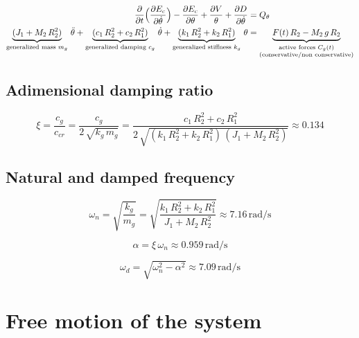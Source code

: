 \documentclass[a4paper,12pt,oneside]{article}
\begin{document}
\begin{align}
\label{eqn:motion}
	\frac{\partial}{\partial t} %
		\Bigl(\frac{\partial E_c}{\partial \dot{\theta}}\Bigr) - %
		\frac{\partial E_c}{\partial \theta} + %
		\frac{\partial V}{\theta} + %
		\frac{\partial D}{\partial \dot{\theta}} & = Q_\theta \notag \\
	\underbrace{(J_1 + M_2 \, R_2^2)}_ %
		{\text{generalized mass $ m_g $}} \, \ddot{\theta} + %
		\underbrace{(c_1 \, R_2^2 + c_2 \, R_1^2)}_ %
		{\text{generalized damping $ c_g $}} \, \dot{\theta} + %
		\underbrace{(k_1 \, R_2^2 + k_2 \, R_1^2)}_ %
		{\text{generalized stiffness $  k_g $}} \, \theta & = %
		\underbrace{F(t) \, R_2 - M_2 \, g \, R_2}_ %
		{\substack{\text{active forces $ C_g(t) $} \\ %
		\text{(conservative/non conservative)}}}
\end{align}

\subsection{Adimensional damping ratio}

\begin{equation}
\label{eqn:damping_ratio}
	\xi = \frac{c_g}{c_{cr}} = %
		\frac{c_g}{2 \, \sqrt{k_g \, m_g}} %
		= \frac{c_1 \, R_2^2 + c_2 \, R_1^2} %
		{2 \, \sqrt{(k_1 \, R_2^2 + k_2 \, R_1^2) \, (J_1 + M_2 \, R_2^2)}} %
		\approx 0.134
\end{equation}

\subsection{Natural and damped frequency}

\[
	\omega_n = \sqrt{\frac{k_g}{m_g}} = %
		\sqrt{\frac{k_1 \, R_2^2 + k_2 \, R_1^2}{J_1 + M_2 \, R_2^2}} %
		\approx 7.16 \, \text{rad/s}
\]

\begin{equation}
\label{eqn:damping_factor}
  \alpha = \xi \, \omega_n \approx 0.959 \, \text{rad/s}
\end{equation}

\begin{equation}
\label{eqn:damped_frequency}
	\omega_d = \sqrt{\omega_n^2 - \alpha^2} \approx 7.09 \, \text{rad/s}
\end{equation}


\section{Free motion of the system}
\end{document}
